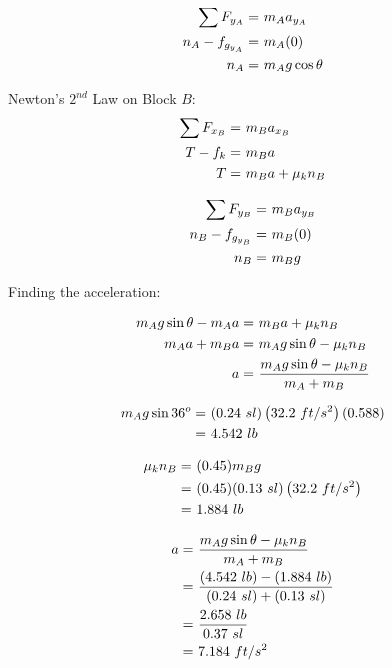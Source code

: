 		\begin{align}
			\sum F_{y_{A}} = \ &m_{A}a_{y_{A}}& \notag \\
			n_{A} - f_{g_{y_{A}}} = \ &m_{A}(0)& \notag \\
			n_{A} = \ &m_{A}g \cos \theta& \notag
		\end{align}

		Newton's $2^{nd}$ Law on Block $B$:
		\begin{align}
			\sum F_{x_{B}} = \ &m_{B}a_{x_{B}}& \notag \\
			T - f_{k} = \ &m_{B}a& \notag \\
			T = \ &m_{B}a + \mu_{k}n_{B}& \notag
		\end{align}

		\begin{align}
			\sum F_{y_{B}} = \ &m_{B}a_{y_{B}}& \notag \\
			n_{B} - f_{g_{y_{B}}} = \ &m_{B}(0)& \notag \\
			n_{B} = \ &m_{B}g& \notag
		\end{align}

		Finding the acceleration:

		\begin{align}
			m_{A}g \sin \theta - m_{A}a = \ &m_{B}a + \mu_{k}n_{B}& \notag \\
			m_{A}a + m_{B}a = \ &m_{A}g \sin \theta - \mu_{k}n_{B}& \notag \\
			a = \ &\frac{m_{A}g \sin \theta - \mu_{k}n_{B}}{m_{A} + m_{B}}& \notag
		\end{align}

		\begin{align}
			m_{A}g \sin 36^{o} = \ &(0.24 \ sl)\left(32.2 \ ft/s^{2}\right)(0.588)& \notag \\
			= \ &4.542 \ lb& \notag
		\end{align}

		\begin{align}
			\mu_{k}n_{B} = \ &(0.45)m_{B}g& \notag \\
			= \ &(0.45)(0.13 \ sl)\left(32.2 \ ft/s^{2}\right)& \notag \\
			= \ &1.884 \ lb& \notag
		\end{align}

		\begin{align}
			a = \ &\frac{m_{A}g \sin \theta - \mu_{k}n_{B}}{m_{A} + m_{B}}& \notag \\
			= \ &\frac{(4.542 \ lb) - (1.884 \ lb)}{(0.24 \ sl) + (0.13 \ sl)}& \notag \\
			= \ &\frac{2.658 \ lb}{0.37 \ sl}& \notag \\
			= \ &7.184 \ ft/s^{2}&
			\label{eq:hw6_f_acc}
		\end{align}

